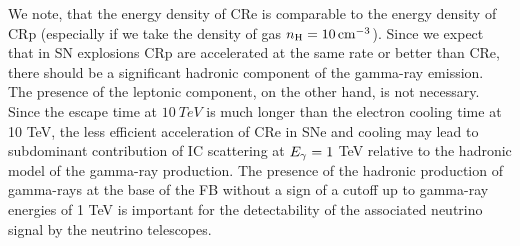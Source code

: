 We note, that the energy density of CRe is comparable to the energy density of CRp 
(especially if we take the density of gas $n_{\text{H}} = \SI{10}{cm^{-3}}$).
Since we expect that in SN explosions CRp are accelerated at the same rate or better than CRe,
there should be a significant hadronic component of the gamma-ray emission.
The presence of the leptonic component, on the other hand, is not necessary.
Since the escape time at $\SI{10}{TeV}$ is much longer than the electron cooling time at 10 TeV, 
the less efficient acceleration of CRe in SNe and cooling may lead to subdominant contribution of 
IC scattering at $E_\gamma = 1$ TeV relative to the hadronic model of the gamma-ray production.
The presence of the hadronic production of gamma-rays at the base of the FB without a sign of a cutoff up to gamma-ray energies
of 1 TeV is important for the detectability of the associated neutrino signal by the neutrino telescopes.

